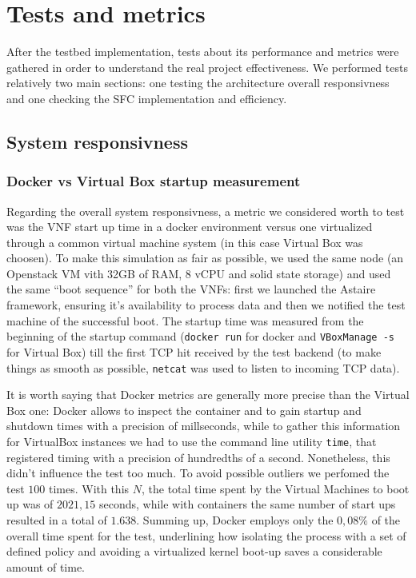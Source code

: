\chapter{Tests and metrics}

After the testbed implementation, tests about its performance and metrics were
gathered in order to understand the real project effectiveness. We performed
tests relatively two main sections: one testing the architecture overall
responsivness and one checking the SFC implementation and efficiency.

\section{System responsivness}

\subsection{Docker vs Virtual Box startup measurement}

Regarding the overall system responsivness, a metric we considered worth to 
test was the VNF start up time in a docker environment versus one virtualized 
through a common virtual machine system (in this case Virtual Box was choosen). 
To make this simulation as fair as possible, we used the same node (an 
Openstack VM vith 32GB of RAM, 8 vCPU and solid state storage) and used the same 
``boot sequence'' for both the VNFs: first we launched the Astaire framework, 
ensuring it's availability to process data and then we notified the test 
machine of the successful boot. The startup time was measured from the 
beginning of the startup command (\verb!docker run! for docker and 
\verb!VBoxManage -s! for Virtual Box) till the first TCP hit received by the 
test backend (to make things as smooth as possible, \verb!netcat! was used 
to listen to incoming TCP data).

It is worth saying that Docker metrics are generally more precise than the
Virtual Box one: Docker allows to inspect the container and to gain startup and
shutdown times with a precision of millseconds, while to gather this information
for VirtualBox instances we had to use the command line utility \verb!time!,
that registered timing with a precision of hundredths of a second. Nonetheless,
this didn't influence the test too much. To avoid possible outliers we perfomed
the test $100$ times. With this $N$, the total time spent by the Virtual
Machines to boot up was of $2021,15$ seconds, while with containers the same
number of start ups resulted in a total of $1.638$. Summing up, Docker employs
only the $0,08\%$ of the overall time spent for the test, underlining how
isolating the process with a set of defined policy and avoiding a virtualized
kernel boot-up saves a considerable amount of time.


